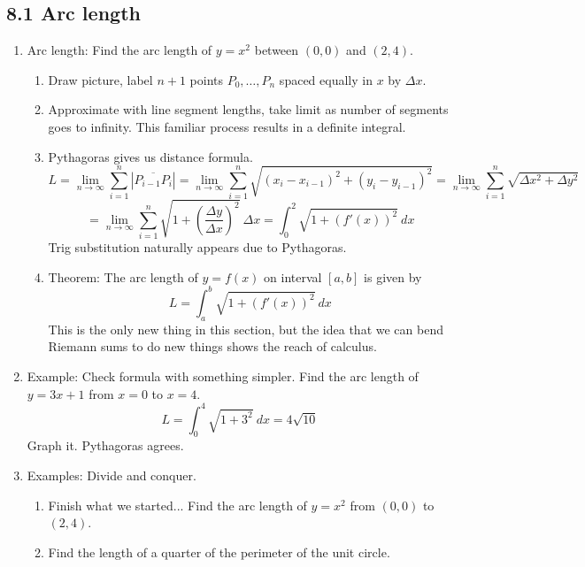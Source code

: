 \documentclass{article}
\begin{document}
\subsection{8.1 Arc length}
\begin{enumerate}


\item Arc length: Find the arc length of $y = x^2$ between $(0,0)$ and $(2,4)$. 
\begin{enumerate}
\item Draw picture, label $n+1$ points $P_0,\dots,P_n$ spaced equally in $x$ by $\Delta x$. 
\item Approximate with line segment lengths, take limit as number of segments goes to infinity. This familiar process results in a definite integral. 
\item Pythagoras gives us distance formula.
\[
L = \lim_{n\rightarrow \infty} \sum_{i=1}^n \left| \overline{P_{i-1}P_i}\right|
= \lim_{n\rightarrow \infty} \sum_{i=1}^n \sqrt{(x_i-x_{i-1})^2 + (y_i-y_{i-1})^2}
= \lim_{n\rightarrow \infty} \sum_{i=1}^n \sqrt{\Delta x^2 + \Delta y^2}
\]
\[
= \lim_{n\rightarrow \infty} \sum_{i=1}^n \sqrt{1 + \left(\frac{\Delta y}{\Delta x}\right)^2} ~\Delta x
= \int_0^2 \sqrt{1 + \left(f'(x)\right)^2}~dx
\]
Trig substitution naturally appears due to Pythagoras.
\item Theorem: The arc length of $y=f(x)$ on interval $[a,b]$ is given by
\[
L = \int_a^b \sqrt{1 + \left(f'(x)\right)^2}~dx
\]
This is the only new thing in this section, but the idea that we can bend Riemann sums to do new things shows the reach of calculus.
\end{enumerate}

\item Example: Check formula with something simpler. Find the arc length of $y=3x+1$ from $x=0$ to $x=4$.
\[
L = \int_0^4 \sqrt{1+3^2}~dx = 4\sqrt{10}
\]
Graph it. Pythagoras agrees.


\item Examples: Divide and conquer.
\begin{enumerate}
\item Finish what we started... Find the arc length of $y=x^2$ from $(0,0)$ to $(2,4)$. 
\item Find the length of a quarter of the perimeter of the unit circle.
\end{enumerate}



\end{enumerate}
\end{document}
